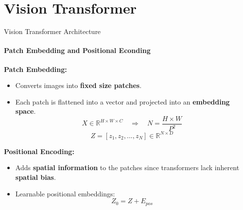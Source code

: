 \section{Vision Transformer}

\begin{frame}[fragile]{Vision Transformer Architecture}
  \framesubtitle{Patch Embedding and Positional Econding}
  \textbf{Patch Embedding:}
  \begin{itemize}
    \item Converts images into \textbf{fixed size patches}.
    \item Each patch is flattened into a vector and projected into an \textbf{embedding space}.
      \begin{equation}
        X \in \mathbb{R}^{H \times W \times C} \quad \Rightarrow \quad N = \frac{H \times W}{P^2}
      \end{equation}
      \begin{equation}
        Z = [z_1, z_2, ..., z_N] \in \mathbb{R}^{N \times D}
      \end{equation}
  \end{itemize}

  \textbf{Positional Encoding:}
  \begin{itemize}
    \item Adds \textbf{spatial information} to the patches since transformers lack inherent \textbf{spatial bias}.
    \item Learnable positional embeddings:
      \begin{equation}
        Z_0 = Z + E_{pos}
      \end{equation}
  \end{itemize}
\end{frame}

